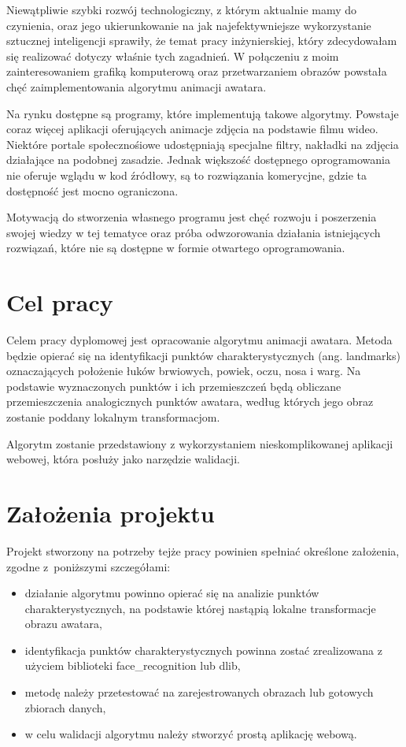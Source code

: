 Niewątpliwie szybki rozwój technologiczny, z którym aktualnie mamy do czynienia, oraz jego ukierunkowanie na jak najefektywniejsze wykorzystanie sztucznej inteligencji sprawiły, że temat pracy inżynierskiej, który zdecydowałam się realizować dotyczy właśnie tych zagadnień. W połączeniu z moim zainteresowaniem grafiką komputerową oraz przetwarzaniem obrazów powstała chęć zaimplementowania algorytmu animacji awatara.

Na rynku dostępne są programy, które implementują takowe algorytmy. Powstaje coraz więcej aplikacji oferujących animacje zdjęcia na podstawie filmu wideo. Niektóre portale społecznośiowe udostępniają specjalne filtry, nakładki na zdjęcia działające na podobnej zasadzie. Jednak większość dostępnego oprogramowania nie oferuje wglądu w kod źródłowy, są to rozwiązania komerycjne, gdzie ta dostępność jest mocno ograniczona.

Motywacją do stworzenia własnego programu jest chęć rozwoju i poszerzenia swojej wiedzy w tej tematyce oraz próba odwzorowania działania istniejących rozwiązań, które nie są dostępne w formie otwartego oprogramowania. 



\section{Cel pracy}

Celem pracy dyplomowej jest opracowanie algorytmu animacji awatara. Metoda będzie opierać się na identyfikacji punktów charakterystycznych (ang. landmarks) oznaczających położenie łuków brwiowych, powiek, oczu, nosa i warg. Na podstawie wyznaczonych punktów i ich przemieszczeń będą obliczane przemieszczenia analogicznych punktów awatara, według których jego obraz zostanie poddany lokalnym transformacjom.

Algorytm zostanie przedstawiony z wykorzystaniem nieskomplikowanej aplikacji webowej, która posłuży jako narzędzie walidacji.


\section{Założenia projektu}
\label{sec:zalozeniaProjektu}
Projekt stworzony na potrzeby tejże pracy powinien spełniać określone założenia, zgodne z~poniższymi szczegółami:
\begin{itemize}
    \item działanie algorytmu powinno opierać się na analizie punktów charakterystycznych, na podstawie której nastąpią lokalne transformacje obrazu awatara,
    \item identyfikacja punktów charakterystycznych powinna zostać zrealizowana z użyciem biblioteki face\_recognition lub dlib,
    \item metodę należy przetestować na zarejestrowanych obrazach lub gotowych zbiorach danych,
    \item w celu walidacji algorytmu należy stworzyć prostą aplikację webową.
\end{itemize}

